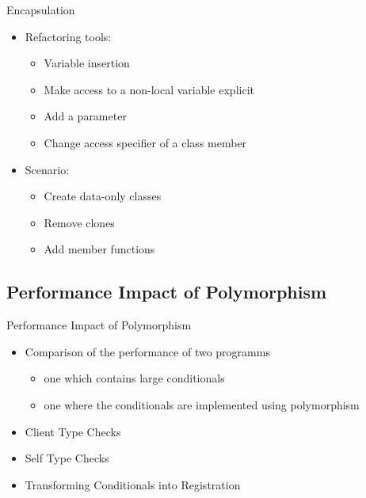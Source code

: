 \documentclass{beamer}
\begin{document}
\begin{frame}{Encapsulation}
  \begin{itemize}
    \item Refactoring tools:
      \begin{itemize}
        \item Variable insertion
        \item Make access to a non-local variable explicit
        \item Add a parameter
        \item Change access specifier of a class member
      \end{itemize}
  \end{itemize}
  \pause
  \begin{itemize}
    \item Scenario:
      \begin{itemize}
        \item Create data-only classes
        \item Remove clones
        \item Add member functions
      \end{itemize}
  \end{itemize}
\end{frame}

\subsection{Performance Impact of Polymorphism}

\begin{frame}{Performance Impact of Polymorphism}
  
  \begin{itemize}
    \item Comparison of the performance of two programms
    \begin{itemize}
      \item one which contains large conditionals
      \item one where the conditionals are implemented using polymorphism
    \end{itemize}
  \end{itemize}
\pause
  \begin{itemize}
  	\item Client Type Checks
  	\item Self Type Checks
  	\item Transforming Conditionals into Registration
  \end{itemize}
\end{frame}
\end{document}
